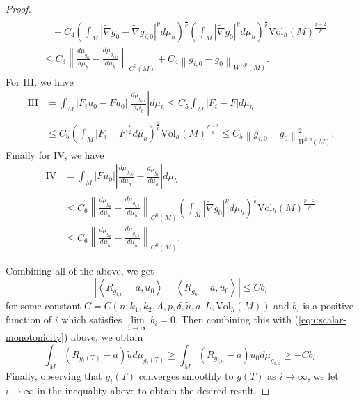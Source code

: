 \documentclass[12pt]{amsart}
\newcommand{\hdel}{\tilde{\nabla}}
\theoremstyle{remark}
\numberwithin{equation}{section}
\begin{document}
\begin{proof}
\begin{align*}
        &\quad + C_4\left(\int_M |\hdel g_0 - \hdel g_{i,0}|^pd\mu_h\right)^\frac{1}{p}\left(\int_M |\hdel g_0|^pd\mu_h\right)^\frac{1}{p}\text{Vol}_h(M)^\frac{p-2}{p} \nonumber \\
        &\leq C_3\left\lVert \frac{d\mu_{g_0}}{d\mu_h} - \frac{d\mu_{g_{i,0}}}{d\mu_h}\right\rVert_{C^0(M)} + C_4\left\lVert g_{i,0} - g_0\right\rVert_{W^{1,p}(M)}.
    \end{align*}
    For III, we have
    \begin{align*}
        \text{III} &= \int_M |F_iu_0 - Fu_0|\left|\frac{d\mu_{g_{i,0}}}{d\mu_h}\right|d\mu_h \leq C_5 \int_M |F_i - F|d\mu_h \nonumber \\
        &\leq C_5 \left(\int_M |F_i - F|^\frac{p}{2}d\mu_h\right)^\frac{2}{p}\text{Vol}_h(M)^\frac{p-2}{p} \leq C_5\left\lVert g_{i,0} - g_0\right\rVert_{W^{1,p}(M)}^2.
    \end{align*}
    Finally for IV, we have
    \begin{align*}
        \text{IV} &= \int_M |Fu_0|\left|\frac{d\mu_{g_{i,0}}}{d\mu_h} - \frac{d\mu_{g_0}}{d\mu_h}\right|d\mu_h \nonumber \\
        &\leq C_6\left\lVert \frac{d\mu_{g_0}}{d\mu_h} - \frac{d\mu_{g_{i,0}}}{d\mu_h}\right\rVert_{C^0(M)}\left(\int_M |\hdel g_0|^pd\mu_h\right)^\frac{1}{p}\text{Vol}_h(M)^\frac{p-2}{p} \nonumber \\
        &\leq C_6\left\lVert \frac{d\mu_{g_0}}{d\mu_h} - \frac{d\mu_{g_{i,0}}}{d\mu_h}\right\rVert_{C^0(M)}.
    \end{align*}

    Combining all of the above, we get
    \begin{equation*}
        \left|\left\langle R_{g_{i,0}}-a, u_0\right\rangle - \left\langle R_{g_0} - a, u_0\right\rangle \right| \leq Cb_i
    \end{equation*}
    for some constant $C = C(n,k_1,k_2,\Lambda,p,\delta,\tilde{u},a,L,\text{Vol}_h(M))$ and $b_i$ is a positive function of $i$ which satisfies $\lim\limits_{i\to\infty} b_i = 0$. Then combining this with (\ref{eqn:scalar-monotonicity}) above, we obtain
    \begin{equation*}
        \int_M (R_{g_i(T)}-a)\tilde{u}d\mu_{g_i(T)} \geq \int_M (R_{g_{i,0}}-a)u_0d\mu_{g_{i,0}} \geq -Cb_i.
    \end{equation*}
    Finally, observing that $g_i(T)$ converges smoothly to $g(T)$ as $i \to \infty$, we let $i \to \infty$ in the inequality above to obtain the desired result.
\end{proof}
\end{document}
